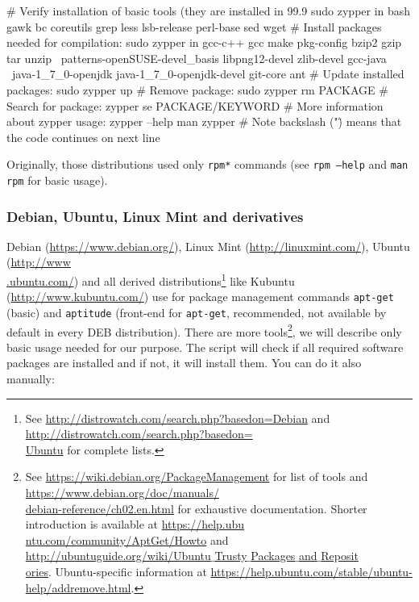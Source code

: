 \documentclass[a4paper, 11pt, twoside]{article}
\begin{document}
\begin{bashcode}
  # Verify installation of basic tools (they are installed in 99.9%
  sudo zypper in bash gawk bc coreutils grep less lsb-release perl-base sed wget
  # Install packages needed for compilation:
  sudo zypper in gcc-c++ gcc make pkg-config bzip2 gzip tar unzip \
    patterns-openSUSE-devel_basis libpng12-devel zlib-devel gcc-java \
    java-1_7_0-openjdk java-1_7_0-openjdk-devel git-core ant
  # Update installed packages:
  sudo zypper up
  # Remove package:
  sudo zypper rm PACKAGE
  # Search for package:
  zypper se PACKAGE/KEYWORD
  # More information about zypper usage:
  zypper --help
  man zypper
  # Note backslash ("\") means that the code continues on next line
\end{bashcode}

Originally, those distributions used only \texttt{rpm*} commands (see \texttt{rpm --help} and \texttt{man rpm} for basic usage).

\subsubsection{Debian, Ubuntu, Linux Mint and derivatives}

Debian (\href{https://www.debian.org/}{https://www.debian.org/}), Linux Mint (\href{http://linuxmint.com/}{http://linuxmint.com/}), Ubuntu (\href{http://www.ubuntu.com/}{http://www\\.ubuntu.com/}) and all derived distributions\footnote{See \href{http://distrowatch.com/search.php?basedon=Debian}{http://distrowatch.com/search.php?basedon=Debian} and \href{http://distrowatch.com/search.php?basedon=Ubuntu}{http://distrowatch.com/search.php?basedon=\\Ubuntu} for complete lists.} like Kubuntu (\href{http://www.kubuntu.com/}{http://www.kubuntu.com/}) use for package management commands \texttt{apt-get} (basic) and \texttt{aptitude} (front-end for \texttt{apt-get}, recommended, not available by default in every DEB distribution). There are more tools\footnote{See \href{https://wiki.debian.org/PackageManagement}{https://wiki.debian.org/PackageManagement} for list of tools and \href{https://www.debian.org/doc/manuals/debian-reference/ch02.en.html}{https://www.debian.org/doc/manuals/\\debian-reference/ch02.en.html} for exhaustive documentation. Shorter introduction is available at \href{https://help.ubuntu.com/community/AptGet/Howto}{https://help.ubu\\ntu.com/community/AptGet/Howto} and \href{http://ubuntuguide.org/wiki/Ubuntu_Trusty_Packages_and_Repositories}{http://ubuntuguide.org/wiki/Ubuntu$\_$Trusty$\_$Packages$\_$and$\_$Reposit\\ories}. Ubuntu-specific information at \href{https://help.ubuntu.com/stable/ubuntu-help/addremove.html}{https://help.ubuntu.com/stable/ubuntu-help/addremove.html}.}, we will describe only basic usage needed for our purpose. The script will check if all required software packages are installed and if not, it will install them. You can do it also manually:
\end{document}

